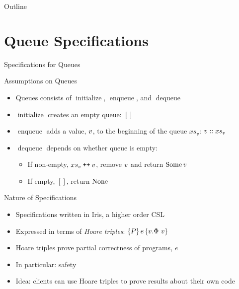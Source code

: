 \documentclass[9pt]{beamer}
\newcommand{\initialise}{\operatorname{initialize}}
\newcommand{\enqueue}{\operatorname{enqueue}}
\newcommand{\dequeue}{\operatorname{dequeue}}
\newcommand{\absvalue}{\val}
\newcommand{\absvalueList}{xs_v}
\newcommand\catenate{\mathbin{\text{\ttfamily\upshape ++}}}
\begin{document}

\begin{frame}{Outline}
  \tableofcontents
\end{frame}


\section{Queue Specifications}

\begin{frame}{Specifications for Queues}
  \begin{block}{Assumptions on Queues}
    \begin{itemize}
      \item Queues consists of $\initialise$, $\enqueue$, and $\dequeue$
      \item $\initialise$ creates an empty queue: $[]$
      \item $\enqueue$ adds a value, $\absvalue$, to the beginning of the queue $\absvalueList$: $\absvalue :: \absvalueList$
      \item $\dequeue$ depends on whether queue is empty:
        \begin{itemize}
          \item If non-empty, $\absvalueList \catenate \absvalue$, remove $\absvalue$ and return $\Some \absvalue$
          \item If empty, $[]$, return $\operatorname{None}$
        \end{itemize}
    \end{itemize}
  \end{block}
  \begin{block}{Nature of Specifications}
    \begin{itemize}
      \item Specifications written in Iris, a higher order CSL
      \item Expressed in terms of \textit{Hoare triples}: $\hoare{P}{e}{v. \Phi ~ v}$
      \item Hoare triples prove partial correctness of programs, $e$
      \item In particular: safety
      \item Idea: clients can use Hoare triples to prove results about their own code
    \end{itemize}
  \end{block}
\end{frame}
\end{document}
